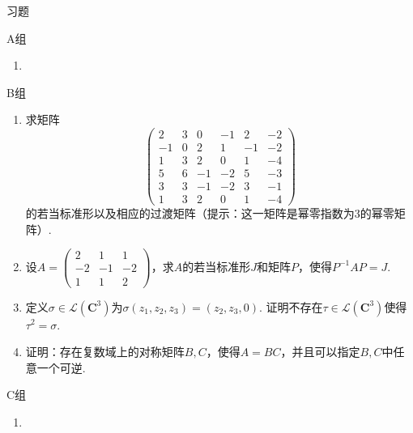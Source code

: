 \vspace{2ex}
\centerline{\heiti \Large 习题}

\vspace{2ex}
{\kaishu }
\begin{flushright}
    \kaishu

\end{flushright}

\centerline{\heiti A组}
\begin{enumerate}
    \item
\end{enumerate}

\centerline{\heiti B组}
\begin{enumerate}
    \item 求矩阵\[\begin{pmatrix}
                  2 & 3 & 0  & -1 & 2 & -2 \\ -1 & 0 & 2 & 1 & -1 & -2 \\
                  1 & 3 & 2  & 0  & 1 & -4 \\ 5 & 6 & -1 & -2 & 5 & -3 \\
                  3 & 3 & -1 & -2 & 3 & -1 \\ 1 & 3 & 2 & 0 & 1 & -4
              \end{pmatrix}\]的若当标准形以及相应的过渡矩阵（提示：这一矩阵是幂零指数为3的幂零矩阵）.

    \item 设$A=\begin{pmatrix}
                  2 & 1 & 1 \\ -2 & -1 & -2 \\ 1 & 1 & 2
              \end{pmatrix}$，求$A$的若当标准形$J$和矩阵$P$，使得$P^{-1}AP=J$.

    \item 定义$\sigma\in \mathcal{L}(\mathbf{C}^3)$为$\sigma(z_1,z_2,z_3)=(z_2,z_3,0)$. 证明不存在$\tau\in \mathcal{L}(\mathbf{C}^3)$使得$\tau^2=\sigma$.

    \item 证明：存在复数域上的对称矩阵$B,C$，使得$A=BC$，并且可以指定$B,C$中任意一个可逆.
\end{enumerate}

\centerline{\heiti C组}
\begin{enumerate}
    \item
\end{enumerate}
